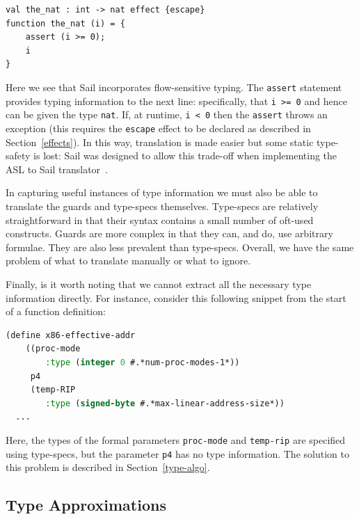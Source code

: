 \documentclass[a4paper,12pt,twoside,openright]{report}
\begin{document}
\begin{minipage}{\linewidth}
\begin{lstlisting}[language=sail]
val the_nat : int -> nat effect {escape}
function the_nat (i) = {
	assert (i >= 0);
	i
}
\end{lstlisting}
\end{minipage}

Here we see that Sail incorporates flow-sensitive typing.  The \texttt{assert} statement provides typing information to the next line: specifically, that \texttt{i >= 0} and hence can be given the type \texttt{nat}.  If, at runtime, \texttt{i < 0} then the \texttt{assert} throws an exception (this requires the \texttt{escape} effect to be declared as described in Section~\ref{effects}).  In this way, translation is made easier but some static type-safety is lost: Sail was designed to allow this trade-off when implementing the ASL to Sail translator~\cite{sail-paper}.

In capturing useful instances of type information we must also be able to translate the guards and type-specs themselves.  Type-specs are relatively straightforward in that their syntax contains a small number of oft-used constructs.  Guards are more complex in that they can, and do, use arbitrary formulae.  They are also less prevalent than type-specs.  Overall, we have the same problem of what to translate manually or what to ignore.

Finally, is it worth noting that we cannot extract all the necessary type information directly.  For instance, consider this following snippet from the start of a function definition:

\begin{minipage}{\linewidth}
\begin{lstlisting}[language=lisp]
(define x86-effective-addr
    ((proc-mode 
        :type (integer 0 #.*num-proc-modes-1*))
     p4
     (temp-RIP
        :type (signed-byte #.*max-linear-address-size*))
  ...
\end{lstlisting}
\end{minipage}

Here, the types of the formal parameters \texttt{proc-mode} and \texttt{temp-rip} are specified using type-specs, but the parameter \texttt{p4} has no type information.  The solution to this problem is described in Section~\ref{type-algo}.

\hypertarget{type-approx}{
\subsection{Type Approximations}\label{type-approx}}
\end{document}
